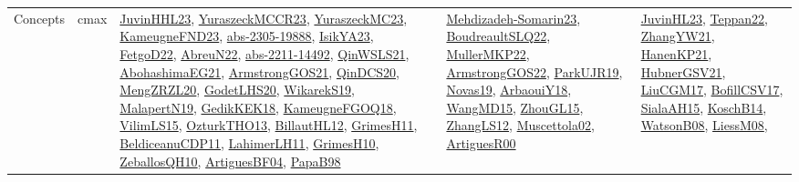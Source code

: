 {\begin{longtable}{lp{3cm}>{\raggedright}p{6cm}>{\raggedright}p{6cm}p{8cm}}
Concepts & cmax & \href{papers/JuvinHHL23.pdf}{JuvinHHL23}\cite{JuvinHHL23}, \href{articles/YuraszeckMCCR23.pdf}{YuraszeckMCCR23}\cite{YuraszeckMCCR23}, \href{papers/YuraszeckMC23.pdf}{YuraszeckMC23}\cite{YuraszeckMC23}, \href{papers/KameugneFND23.pdf}{KameugneFND23}\cite{KameugneFND23}, \href{articles/abs-2305-19888.pdf}{abs-2305-19888}\cite{abs-2305-19888}, \href{articles/IsikYA23.pdf}{IsikYA23}\cite{IsikYA23}, \href{articles/FetgoD22.pdf}{FetgoD22}\cite{FetgoD22}, \href{articles/AbreuN22.pdf}{AbreuN22}\cite{AbreuN22}, \href{articles/abs-2211-14492.pdf}{abs-2211-14492}\cite{abs-2211-14492}, \href{articles/QinWSLS21.pdf}{QinWSLS21}\cite{QinWSLS21}, \href{articles/AbohashimaEG21.pdf}{AbohashimaEG21}\cite{AbohashimaEG21}, \href{papers/ArmstrongGOS21.pdf}{ArmstrongGOS21}\cite{ArmstrongGOS21}, \href{articles/QinDCS20.pdf}{QinDCS20}\cite{QinDCS20}, \href{articles/MengZRZL20.pdf}{MengZRZL20}\cite{MengZRZL20}, \href{papers/GodetLHS20.pdf}{GodetLHS20}\cite{GodetLHS20}, \href{articles/WikarekS19.pdf}{WikarekS19}\cite{WikarekS19}, \href{papers/MalapertN19.pdf}{MalapertN19}\cite{MalapertN19}, \href{articles/GedikKEK18.pdf}{GedikKEK18}\cite{GedikKEK18}, \href{papers/KameugneFGOQ18.pdf}{KameugneFGOQ18}\cite{KameugneFGOQ18}, \href{papers/VilimLS15.pdf}{VilimLS15}\cite{VilimLS15}, \href{articles/OzturkTHO13.pdf}{OzturkTHO13}\cite{OzturkTHO13}, \href{papers/BillautHL12.pdf}{BillautHL12}\cite{BillautHL12}, \href{papers/GrimesH11.pdf}{GrimesH11}\cite{GrimesH11}, \href{articles/BeldiceanuCDP11.pdf}{BeldiceanuCDP11}\cite{BeldiceanuCDP11}, \href{papers/LahimerLH11.pdf}{LahimerLH11}\cite{LahimerLH11}, \href{papers/GrimesH10.pdf}{GrimesH10}\cite{GrimesH10}, \href{articles/ZeballosQH10.pdf}{ZeballosQH10}\cite{ZeballosQH10}, \href{papers/ArtiguesBF04.pdf}{ArtiguesBF04}\cite{ArtiguesBF04}, \href{articles/PapaB98.pdf}{PapaB98}\cite{PapaB98} & \href{papers/Mehdizadeh-Somarin23.pdf}{Mehdizadeh-Somarin23}\cite{Mehdizadeh-Somarin23}, \href{papers/BoudreaultSLQ22.pdf}{BoudreaultSLQ22}\cite{BoudreaultSLQ22}, \href{articles/MullerMKP22.pdf}{MullerMKP22}\cite{MullerMKP22}, \href{papers/ArmstrongGOS22.pdf}{ArmstrongGOS22}\cite{ArmstrongGOS22}, \href{papers/ParkUJR19.pdf}{ParkUJR19}\cite{ParkUJR19}, \href{articles/Novas19.pdf}{Novas19}\cite{Novas19}, \href{papers/ArbaouiY18.pdf}{ArbaouiY18}\cite{ArbaouiY18}, \href{articles/WangMD15.pdf}{WangMD15}\cite{WangMD15}, \href{papers/ZhouGL15.pdf}{ZhouGL15}\cite{ZhouGL15}, \href{papers/ZhangLS12.pdf}{ZhangLS12}\cite{ZhangLS12}, \href{papers/Muscettola02.pdf}{Muscettola02}\cite{Muscettola02}, \href{articles/ArtiguesR00.pdf}{ArtiguesR00}\cite{ArtiguesR00} & \href{papers/JuvinHL23.pdf}{JuvinHL23}\cite{JuvinHL23}, \href{papers/Teppan22.pdf}{Teppan22}\cite{Teppan22}, \href{articles/ZhangYW21.pdf}{ZhangYW21}\cite{ZhangYW21}, \href{papers/HanenKP21.pdf}{HanenKP21}\cite{HanenKP21}, \href{articles/HubnerGSV21.pdf}{HubnerGSV21}\cite{HubnerGSV21}, \href{papers/LiuCGM17.pdf}{LiuCGM17}\cite{LiuCGM17}, \href{papers/BofillCSV17.pdf}{BofillCSV17}\cite{BofillCSV17}, \href{papers/SialaAH15.pdf}{SialaAH15}\cite{SialaAH15}, \href{papers/KoschB14.pdf}{KoschB14}\cite{KoschB14}, \href{papers/WatsonB08.pdf}{WatsonB08}\cite{WatsonB08}, \href{articles/LiessM08.pdf}{LiessM08}\cite{LiessM08}, 
\end{longtable}}
